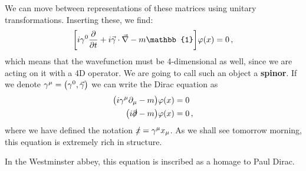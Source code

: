 \documentclass[main.tex]{subfiles}
\begin{document}
We can move between representations of these matrices using unitary transformations. 
Inserting these, we find: 
%
\begin{align}
\qty[ i \gamma^{0} \pdv{}{t} + i \vec{\gamma} \cdot \vec{\nabla} - m \mathbb{1}] \varphi (x) = 0
\,,
\end{align}
%
which means that the wavefunction must be 4-dimensional as well, since we are acting on it with a 4D operator. 
We are going to call such an object a \textbf{spinor}. 
If we denote \(\gamma^{\mu } = \qty(\gamma^{0}, \vec{\gamma}) \) we can write the Dirac equation as 
%
\begin{subequations}
\begin{align}
\qty(i \gamma^{\mu }\partial_{\mu } - m) \varphi (x) &= 0  \\
\qty(i \slashed{\partial} - m ) \varphi (x) &= 0
\,,
\end{align}
\end{subequations}
%
where we have defined the notation \(\slashed{x} = \gamma^{\mu } x_{\mu }\). 
As we shall see tomorrow morning, this equation is extremely rich in structure. 

In the Westminster abbey, this equation is inscribed as a homage to Paul Dirac.
\end{document}
